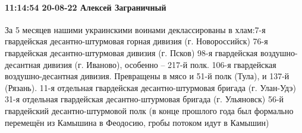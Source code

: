 \paragraph{11:14:54 20-08-22 Алексей Заграничный}

За 5 месяцев нашими украинскими воинами деклассированы в хлам:7-я гвардейская десантно-штурмовая горная дивизия (г. Новороссийск)
76-я гвардейская десантно-штурмовая дивизия (г. Псков)
98-я гвардейская воздушно-десантная дивизия (г. Иваново), особенно – 217-й полк.
106-я гвардейская воздушно-десантная дивизия. Превращены в мясо и 51-й полк (Тула), и 137-й (Рязань).
11-я отдельная гвардейская десантно-штурмовая бригада (г. Улан-Удэ)
31-я отдельная гвардейская десантно-штурмовая бригада (г. Ульяновск)
56-й гвардейский десантно-штурмовой полк (в конце прошлого года был формально перемещён из Камышина в Феодосию, гробы потоком идут в Камышин)
